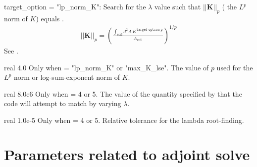 {{\ttfamily target\_option = "lp\_norm\_K"}: Search for the $\lambda$ value such that $|| \bm{K} ||_p$ ( the $L^p$ norm of $K$) equals .
\begin{gather}
|| {\bm{K}} ||_p = \left( \frac{\int_{\text{coil}} d^2 A \, K^{\texttt{target\_option\_p}} }{A_{\text{coil}}} \right)^{1/p}
\end{gather}
See .

}

\myhrule

{real}
{4.0}
{Only when  = {\ttfamily "lp\_norm\_K"} or {\ttfamily "max\_K\_lse"}.}
{The value of $p$ used for the $L^p$ norm or log-sum-exponent norm of $K$.}

\myhrule

{real}
{8.0e6}
{Only when  = 4 or 5.}
{The value of the quantity specified by  that the code will attempt to match
by varying $\lambda$.
}

\myhrule

{real}
{1.0e-5}
{Only when  = 4 or 5.}
{Relative tolerance for the lambda root-finding.}

\myhrule

\section{Parameters related to adjoint solve}

